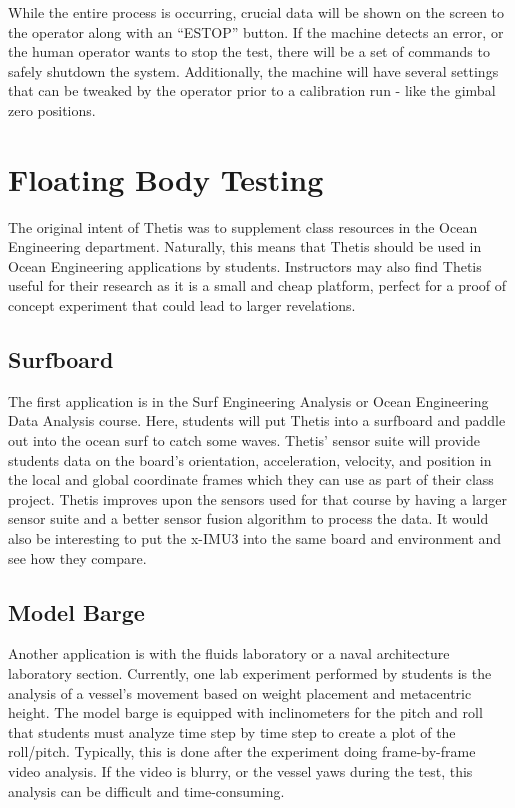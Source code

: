While the entire process is occurring, crucial data will be shown on the screen to the operator along with an ``ESTOP'' button.
If the machine detects an error, or the human operator wants to stop the test, there will be a set of commands to safely shutdown the system.
Additionally, the machine will have several settings that can be tweaked by the operator prior to a calibration run - like the gimbal zero positions.

\section{Floating Body Testing}
The original intent of Thetis was to supplement class resources in the Ocean Engineering department.
Naturally, this means that Thetis should be used in Ocean Engineering applications by students.
Instructors may also find Thetis useful for their research as it is a small and cheap platform, perfect for a proof of concept experiment that could lead to larger revelations.

\subsection{Surfboard}
The first application is in the Surf Engineering Analysis or Ocean Engineering Data Analysis course.
Here, students will put Thetis into a surfboard and paddle out into the ocean surf to catch some waves.
Thetis' sensor suite will provide students data on the board's orientation, acceleration, velocity, and position in the local and global coordinate frames which they can use as part of their class project.
Thetis improves upon the sensors used for that course by having a larger sensor suite and a better sensor fusion algorithm to process the data.
It would also be interesting to put the x-IMU3 into the same board and environment and see how they compare.

\subsection{Model Barge}
Another application is with the fluids laboratory or a naval architecture laboratory section.
Currently, one lab experiment performed by students is the analysis of a vessel's movement based on weight placement and metacentric height.
The model barge is equipped with inclinometers for the pitch and roll that students must analyze time step by time step to create a plot of the roll/pitch.
Typically, this is done after the experiment doing frame-by-frame video analysis.
If the video is blurry, or the vessel yaws during the test, this analysis can be difficult and time-consuming.


